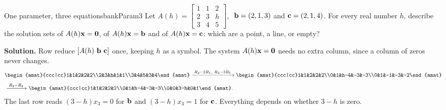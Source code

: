 \documentclass[11pt]{article}
\begin{document}
\begin{exmp}{One parameter, three equations}{bankParam3}
Let $A(h)=\begin{bmatrix}1&1&2\\2&3&h\\3&4&5\end{bmatrix}$, $\ \mathbf{b}=(2,1,3)$ and $\mathbf{c}=(2,1,4)$. For every real number $h$, describe the solution sets of $A(h)\mathbf{x}=\mathbf{0}$, of $A(h)\mathbf{x}=\mathbf{b}$ and of $A(h)\mathbf{x}=\mathbf{c}$: which are a point, a line, or empty?

\textbf{Solution.} Row reduce $[A(h)\ \mathbf{b}\ \mathbf{c}]$ once, keeping $h$ as a symbol. The system $A(h)\mathbf{x}=\mathbf{0}$ needs no extra column, since a column of zeros never changes.
\begin{align*}
&\begin{amat}{ccc|cc}1&1&2&2&2\\2&3&h&1&1\\3&4&5&3&4\end{amat}
\rops{R_2-2R_1,\ R_3-3R_1}
\begin{amat}{ccc|cc}1&1&2&2&2\\0&1&h-4&-3&-3\\0&1&-1&-3&-2\end{amat}\\[4pt]
&\rops{R_3-R_2}
\begin{amat}{ccc|cc}1&1&2&2&2\\0&1&h-4&-3&-3\\0&0&3-h&0&1\end{amat}.
\end{align*}
The last row reads $(3-h)x_3=0$ for $\mathbf{b}$ and $(3-h)x_3=1$ for $\mathbf{c}$. Everything depends on whether $3-h$ is zero.


\end{exmp}
\end{document}
